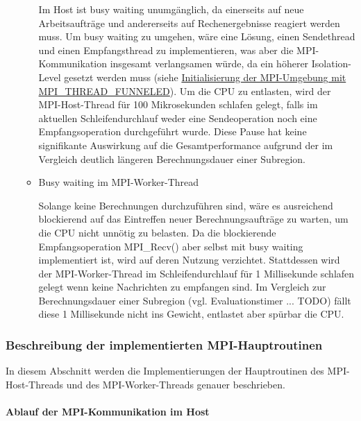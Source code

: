 \begin{itemize}
\begin{itemize}
		Im Host ist busy waiting unumgänglich, da einerseits auf neue Arbeitsaufträge und andererseits auf Rechenergebnisse reagiert werden muss. Um busy waiting zu umgehen, wäre eine Lösung, einen Sendethread und einen Empfangsthread zu implementieren, was aber die MPI-Kommunikation insgesamt verlangsamen würde, da ein höherer Isolation-Level gesetzt werden muss (siehe \hyperref[item:mpi_init]{Initialisierung der MPI-Umgebung mit MPI\_THREAD\_FUNNELED}). Um die CPU zu entlasten, wird der MPI-Host-Thread für 100 Mikrosekunden schlafen gelegt, falls im aktuellen Schleifendurchlauf weder eine Sendeoperation noch eine Empfangsoperation durchgeführt wurde. Diese Pause hat keine signifikante Auswirkung auf die Gesamtperformance aufgrund der im Vergleich deutlich längeren Berechnungsdauer einer Subregion.
		
		\item Busy waiting im MPI-Worker-Thread
		
		Solange keine Berechnungen durchzuführen sind, wäre es ausreichend blockierend auf das Eintreffen neuer Berechnungsaufträge zu warten, um die CPU nicht unnötig zu belasten. Da die blockierende Empfangsoperation MPI\_Recv() aber selbst mit busy waiting implementiert ist, wird auf deren Nutzung verzichtet. Stattdessen wird der MPI-Worker-Thread im Schleifendurchlauf für 1 Millisekunde schlafen gelegt wenn keine Nachrichten zu empfangen sind. Im Vergleich zur Berechnungsdauer einer Subregion (vgl. Evaluationstimer ... TODO) fällt diese 1 Millisekunde nicht ins Gewicht, entlastet aber spürbar die CPU.
		
	\end{itemize} 
	
\end{itemize}

\subsubsection{Beschreibung der implementierten MPI-Hauptroutinen}

In diesem Abschnitt werden die Implementierungen der Hauptroutinen des MPI-Host-Threads und des MPI-Worker-Threads genauer beschrieben.

\paragraph{Ablauf der MPI-Kommunikation im Host}

